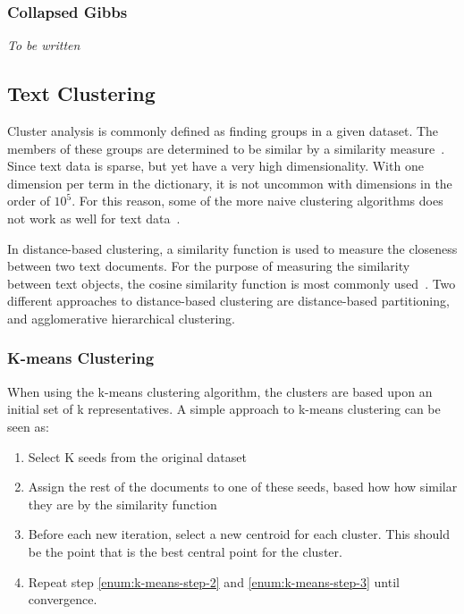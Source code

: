 \subsubsection{Collapsed Gibbs}

\textit{To be written}

\subsection{Text Clustering}

Cluster analysis is commonly defined as finding groups in a given dataset.
The members of these groups are determined to be similar by a similarity measure~\cite{kaufman2009finding, aggarwal2012survey}.
Since text data is sparse, but yet have a very high dimensionality.
With one dimension per term in the dictionary, it is not uncommon with dimensions in the order of $10^5$.
For this reason, some of the more naive clustering algorithms does not work as well for text data~\cite{aggarwal2012survey}.

In distance-based clustering, a similarity function is used to measure the closeness between two text documents.
For the purpose of measuring the similarity between text objects, the cosine similarity function is most commonly used~\cite{aggarwal2012survey}.
Two different approaches to distance-based clustering are distance-based partitioning, and agglomerative hierarchical clustering.

\subsubsection{K-means Clustering}

When using the k-means clustering algorithm, the clusters are based upon an initial set of k representatives.
A simple approach to k-means clustering can be seen as:

\begin{enumerate}
    \item Select K seeds from the original dataset
    \item \label{enum:k-means-step-2} Assign the rest of the documents to one of these seeds, based how how similar they are by the similarity function
    \item \label{enum:k-means-step-3} Before each new iteration, select a new centroid for each cluster. This should be the point that is the best central point for the cluster.
    \item Repeat step \ref{enum:k-means-step-2} and \ref{enum:k-means-step-3} until convergence.
\end{enumerate}

